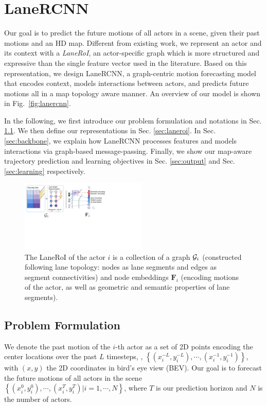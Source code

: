 
\section{LaneRCNN}


Our goal is to  predict the future motions of all actors in a scene, given their
past motions and an HD map. Different from existing work, we represent an actor
and its context with a \textit{LaneRoI}, an actor-specific graph which is more
structured and expressive than the single feature vector used in the literature. 
Based
on this representation, we design LaneRCNN, a graph-centric motion forecasting
model that encodes context, models interactions between actors, and predicts future motions all in
a map topology aware manner. An overview of our model is shown in
Fig.~\ref{fig:lanercnn}.

In the following, we first introduce our problem formulation and notations 
in Sec. \ref{sec:notation}. We then define our \ROI representations in Sec.
\ref{sec:laneroi}. In Sec. \ref{sec:backbone}, we explain how LaneRCNN processes features and models interactions via graph-based message-passing. 
Finally, we show our map-aware trajectory prediction and learning objectives
in Sec. \ref{sec:output} and Sec. \ref{sec:learning} respectively.






\begin{figure}[t]
\begin{center}
  \includegraphics[height=3.4cm]{figures/laneroi.pdf}
\end{center}
\vspace{-0.2cm}
\caption{
The LaneRoI of the actor $i$ is a collection of a graph $\mathcal{G}_i$ (constructed following lane topology: nodes as
lane segments and edges as segment connectivities) and node
embeddings $\mathbf{F}_i$ (encoding motions of the actor, as well as
geometric and semantic properties of lane segments).}
\vspace{-0.2cm}
\label{fig:laneroi}
\end{figure}
\subsection{Problem Formulation}
\label{sec:notation}
We denote the  past motion of the $i$-th actor as a set of 2D points encoding
the center locations over the past $L$ 
 timesteps, \ie, $\left\{(x_i^{-L}, y_i^{-L}), \cdots, (x_i^{-1},
y_i^{-1})\right\}$, with $(x,y)$  the  2D coordinates  in bird's eye view (BEV). Our goal is to forecast the future motions of all actors in the scene 
$\left\{(x_i^{0}, y_i^{0}), \cdots, (x_i^T, y_i^T) | i = 1, \cdots, N\right\}$,
where $T$ is our prediction horizon and $N$ is the number of actors. 

